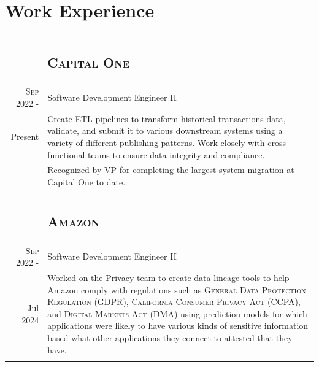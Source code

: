 \documentclass[letterpaper,10pt]{article}
\begin{document}
\section{Work Experience}
\begin{tabular}{R|B}
	                              & \subsection{\textsc{Capital One}}                                                                                      \\
	\textsc{Sep} 2022 -           & Software Development Engineer II                                                                                       \\
	Present\phantom{ -}
	                              & \footnotesize Create ETL pipelines to transform historical transactions data, validate, and submit it to various
	downstream systems using a variety of different publishing patterns. Work closely with cross-functional teams to ensure data integrity and compliance. \\
	                              & \footnotesize Recognized by VP for completing the largest system migration at Capital One to date.                     \\
	                                                                                                                                   \\
	                              & \subsection{\textsc{Amazon}}                                                                                           \\
	\textsc{Sep} 2022 -           & Software Development Engineer II                                                                                       \\
	Jul 2024\phantom{ -}
	                              & \footnotesize Worked on the Privacy team to create data lineage tools to help
	Amazon comply with regulations such as \textsc{General Data Protection Regulation (GDPR), California Consumer Privacy Act (CCPA)},
	and \textsc{Digital Markets Act (DMA)} using prediction models for which applications were likely to have various kinds of sensitive
	information based what other applications they connect to attested that they have.                                                                     \\
	                                                                                                                                   \\


\end{tabular}
\end{document}
